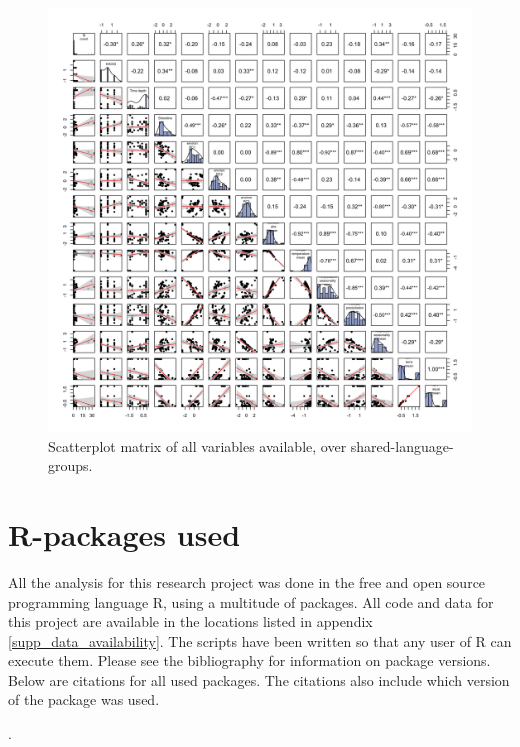 \documentclass[unnumsec,webpdf,modern,medium]{oup-authoring-template}
\begin{document}
\begin{appendices}
\begin{figure}[ht]
\centering
\includegraphics[width=\textwidth]{latex/SPLOM_medium_all_variables}
\caption{Scatterplot matrix of all variables available, over shared-language-groups.}
\label{SPLOM_medium_all_variables}
\end{figure}



\FloatBarrier

\section{R-packages used}
\label{appendix_r_packages}

All the analysis for this research project was done in the free and open source programming language R, using a multitude of packages. All code and data for this project are available in the locations listed in appendix \ref{supp_data_availability}. The scripts have been written so that any user of R can execute them. Please see the bibliography for information on package versions. Below are citations for all used packages. The citations also include which version of the package was used.

.

\end{appendices}
\end{document}
